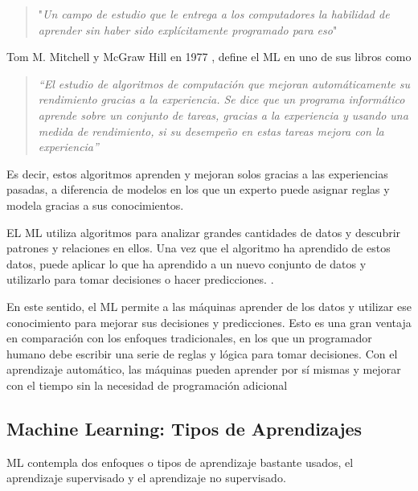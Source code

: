 \begin{quote}
	"\emph{Un campo de estudio que le entrega a los computadores la habilidad de aprender sin haber sido explícitamente programado para eso}"
\end{quote}


Tom M. Mitchell y McGraw Hill en 1977 \cite{mitchell1997machine}, define el ML en uno de sus libros como 
\begin{quote}
	\emph{“El estudio de algoritmos de computación que mejoran automáticamente su rendimiento gracias a la experiencia. Se dice que un programa informático aprende sobre un conjunto de tareas, gracias a la experiencia y usando una medida de rendimiento, si su desempeño en estas tareas mejora con la experiencia”}
\end{quote}

\par Es decir, estos algoritmos aprenden y mejoran solos gracias a las experiencias pasadas, a diferencia de modelos en los que un experto puede asignar reglas y modela gracias a sus conocimientos.\\
\par EL ML utiliza algoritmos para analizar grandes cantidades de datos y descubrir patrones y relaciones en ellos. Una vez que el algoritmo ha aprendido de estos datos, puede aplicar lo que ha aprendido a un nuevo conjunto de datos y utilizarlo para tomar decisiones o hacer predicciones. \cite{murdoch2019interpretable}.\\
\par En este sentido, el ML permite a las máquinas aprender de los datos y utilizar ese conocimiento para mejorar sus decisiones y predicciones. Esto es una gran ventaja en comparación con los enfoques tradicionales, en los que un programador humano debe escribir una serie de reglas y lógica para tomar decisiones. Con el aprendizaje automático, las máquinas pueden aprender por sí mismas y mejorar con el tiempo sin la necesidad de programación adicional\\

\doublespacing
\subsection{Machine Learning: Tipos de Aprendizajes}
ML contempla dos enfoques o tipos de aprendizaje bastante usados, el aprendizaje supervisado y el aprendizaje no supervisado.\\


\doublespacing
